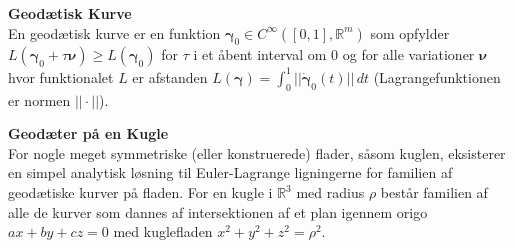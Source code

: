 \newpage


\begin{dfn} {\bf Geodætisk Kurve}\\
En geodætisk kurve er en funktion ${\boldsymbol \gamma}_0 \in C^\infty ([0,1],\mathbb{R}^m)$ som opfylder $L({\boldsymbol \gamma}_0+\tau {\boldsymbol \nu}) \geq L({\boldsymbol \gamma}_0)$ for $\tau$ i et åbent interval om $0$ og for alle variationer ${\boldsymbol \nu}$ hvor funktionalet $L$ er afstanden $L({\boldsymbol \gamma})=\int^1_0 ||\dot{\boldsymbol \gamma}_0(t)|| \, dt$ (Lagrangefunktionen er normen $||\cdot||$).
\end{dfn}

\begin{thm} {\bf Geodæter på en Kugle}\\
\noindent For nogle meget symmetriske (eller konstruerede) flader, såsom kuglen, eksisterer en simpel analytisk løsning til Euler-Lagrange ligningerne for familien af geodætiske kurver på fladen. For en kugle i $\mathbb{R}^3$ med radius $\rho$ består familien af alle de kurver som dannes af intersektionen af et plan igennem origo $ax+by+cz=0$ med kuglefladen $x^2 + y^2 +z^2 =\rho^2$. 
\end{thm}

